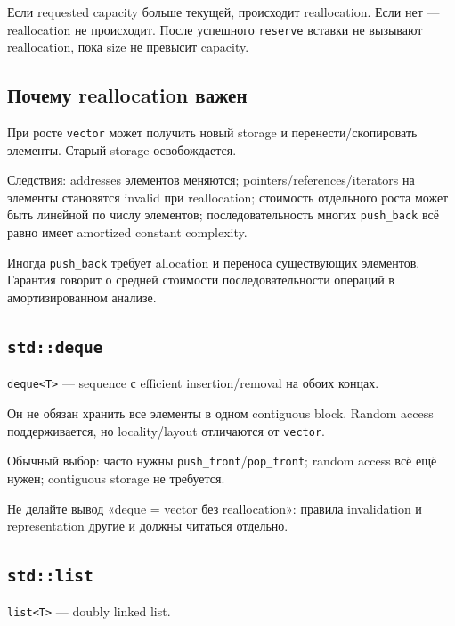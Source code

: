 \begin{standardbox}
Если requested capacity больше текущей, происходит reallocation. Если нет ---
reallocation не происходит. После успешного \texttt{reserve} вставки не
вызывают reallocation, пока size не превысит capacity.
\end{standardbox}

\subsection{Почему reallocation важен}

При росте \texttt{vector} может получить новый storage и перенести/скопировать
элементы. Старый storage освобождается.

Следствия:
addresses элементов меняются; pointers/references/iterators на элементы становятся invalid при reallocation; стоимость отдельного роста может быть линейной по числу элементов; последовательность многих \texttt{push\_back} всё равно имеет amortized constant complexity.

\begin{warningbox}
Иногда \texttt{push\_back} требует allocation и переноса существующих элементов.
Гарантия говорит о средней стоимости последовательности операций в
амортизированном анализе.
\end{warningbox}

\subsection{\texttt{std::deque}}

\texttt{deque<T>} --- sequence с efficient insertion/removal на обоих концах.

Он не обязан хранить все элементы в одном contiguous block. Random access
поддерживается, но locality/layout отличаются от \texttt{vector}.

Обычный выбор:
часто нужны \texttt{push\_front}/\texttt{pop\_front}; random access всё ещё нужен; contiguous storage не требуется.

Не делайте вывод «deque = vector без reallocation»: правила invalidation и
representation другие и должны читаться отдельно.

\subsection{\texttt{std::list}}

\texttt{list<T>} --- doubly linked list.


